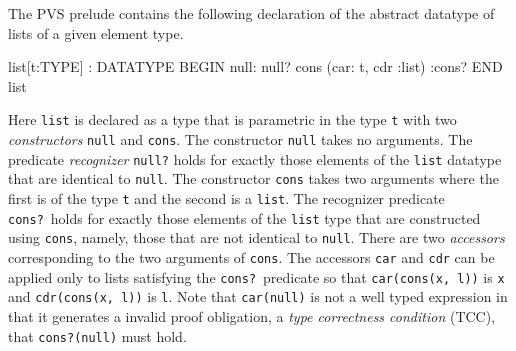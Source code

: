 \documentclass[11pt,twoside]{book}
\begin{document}
The PVS prelude contains the following declaration of 
the abstract datatype of lists of a given element type.  
\begin{session*}
list[t:TYPE] : DATATYPE 
 BEGIN
  null: null?
  cons (car: t, cdr :list) :cons?
 END list
\end{session*}
Here \texttt{list} is declared as a type that is parametric in the type
\texttt{t} with two \emph{constructors} \texttt{null} and \texttt{cons}\@.
The constructor \texttt{null} takes no arguments.  The predicate
\emph{recognizer} \texttt{null?}  holds for exactly those elements of the
\texttt{list} datatype that are identical to \texttt{null}.  The
constructor \texttt{cons} takes two arguments where the first is of the
type \texttt{t} and the second is a \texttt{list}.  The recognizer
predicate \texttt{cons?}\ holds for exactly those elements of the
\texttt{list} type that are constructed using \texttt{cons}, namely, those
that are not identical to \texttt{null}\@.  There are two \emph{accessors}
corresponding to the two arguments of \texttt{cons}\@.  The accessors
\texttt{car} and \texttt{cdr} can be applied only to lists satisfying the
\texttt{cons?}\ predicate so that \texttt{car(cons(x, l))} is \texttt{x}
and \texttt{cdr(cons(x, l))} is \texttt{l}\@.  Note that
\texttt{car(null)} is not a well typed expression in that it generates a
invalid proof obligation, a \emph{type correctness condition} (TCC), that
\texttt{cons?(null)} must hold.
\end{document}
